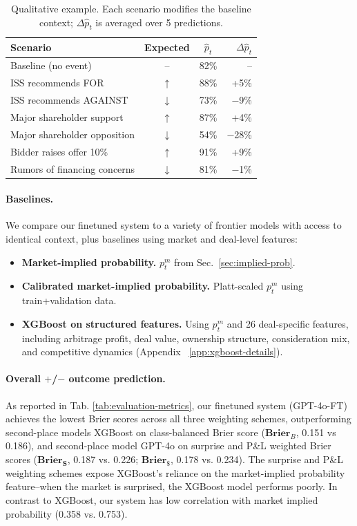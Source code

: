 \documentclass{article}
\theoremstyle{plain}
\theoremstyle{definition}
\theoremstyle{remark}
\newcommand{\Plus}{\boldsymbol{\mathrm{+}}}
\newcommand{\Minus}{\boldsymbol{\mathrm{-}}}
\begin{document}
\begin{table}[t]
\caption{Qualitative example. Each scenario modifies the baseline context; $\Delta \hat{p}_t$ is averaged over 5 predictions.}
\label{tab:scenarios}
\centering
\small
\begin{tabularx}{\columnwidth}{X cc r}
\toprule
Scenario & Expected & $\hat{p}_t$ & $\Delta\hat{p}_t$ \\
\midrule
Baseline (no event) & -- & 82\% & -- \\
ISS recommends FOR & $\uparrow$ & 88\% & +5\% \\
ISS recommends AGAINST & $\downarrow$ & 73\% & $-$9\% \\
Major shareholder support & $\uparrow$ & 87\% & +4\% \\
Major shareholder opposition & $\downarrow$ & 54\% & $-$28\% \\
Bidder raises offer 10\% & $\uparrow$ & 91\% & +9\% \\
Rumors of financing concerns & $\downarrow$ & 81\% & $-$1\% \\
\bottomrule
\end{tabularx}

\end{table}

\label{sec:baselines}

\paragraph{Baselines.}
We compare our finetuned system to a variety of frontier models with access to identical context, plus baselines using market and deal-level features:
\begin{itemize}
    \item \textbf{Market-implied probability.} $p^m_t$ from Sec.~\ref{sec:implied-prob}.
    \item \textbf{Calibrated market-implied probability.} Platt-scaled $p^m_t$ using train+validation data.
    \item \textbf{XGBoost on structured features.} Using $p^m_t$ and 26 deal-specific features, including arbitrage profit, deal value, ownership structure, consideration mix, and competitive dynamics (Appendix ~\ref{app:xgboost-details}).
\end{itemize}

\paragraph{Overall $\Plus$/$\Minus$ outcome prediction.} 
As reported in Tab. \ref{tab:evaluation-metrics}, our finetuned system (GPT-4o-FT) achieves the lowest Brier scores across all three weighting schemes, outperforming second-place models XGBoost on class-balanced Brier score ($\mathbf{Brier}_B$, 0.151 vs 0.186), and second-place model GPT-4o on surprise and P\&L weighted Brier scores ($\mathbf{Brier_S}$, 0.187 vs. 0.226; $\mathbf{Brier_\$}$, 0.178 vs. 0.234). The surprise and P\&L weighting schemes expose XGBoost's reliance on the market-implied probability feature--when the market is surprised, the XGBoost model performs poorly. In contrast to XGBoost, our system has low correlation with market implied probability (0.358 vs. 0.753).
\end{document}
